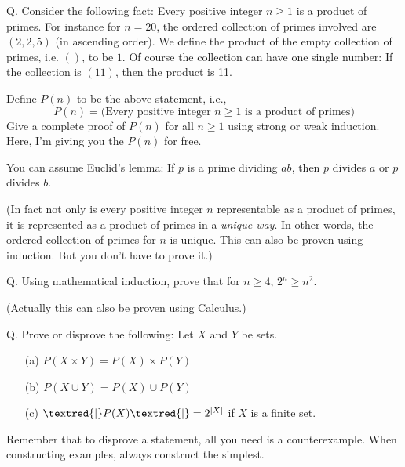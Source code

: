 \SOLUTION



\newpage


\newpage
Q.
Consider the following fact:
Every positive integer $n \geq 1$ is a product of primes.
For instance for $n = 20$,
the ordered collection of primes involved are $(2, 2, 5)$ (in ascending order).
We define the product of the empty collection of primes, i.e. $()$, to be $1$.
Of course the collection can have one single number:
If the collection is $(11)$, then the product is 11.

Define $P(n)$ to be the above statement, i.e.,
\[
  P(n) =
  \biggl(
  \text{Every positive integer $n \geq 1$ is a product of primes}
  \biggr)
\]
Give a complete proof of $P(n)$ for all $n \geq 1$
using strong or weak induction.
Here, I'm giving you the $P(n)$ for free.

You can assume Euclid's lemma: If $p$ is a prime dividing $ab$,
then $p$ divides $a$ or $p$ divides $b$.

(In fact not only is every positive integer $n$ representable
as a product of primes,
it is represented as a product of primes in a \textit{unique way}.
In other words, the ordered collection of primes for $n$ is unique.
This can also be proven using induction.
But you don't have to prove it.)

\SOLUTION



\newpage
Q.
Using mathematical induction, 
prove that for $n \geq 4$, $2^n \geq n^2$.

(Actually this can also be proven using Calculus.)

\SOLUTION



\newpage
Q. Prove or disprove the following: Let $X$ and $Y$ be sets.
\begin{enumerate}
  \item[(a)] $P(X \times Y) = P(X) \times P(Y)$
  \item[(b)] $P(X \cup Y) = P(X) \cup P(Y)$
  \item[(c)] $\textred{|}P(X)\textred{|} = 2^{|X|}$ if $X$ is a finite set.
\end{enumerate}
Remember that to disprove a statement, all you need is a
counterexample.
When constructing examples, always construct the simplest.

